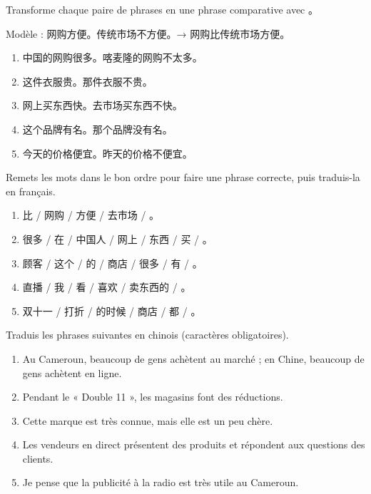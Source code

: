 \documentclass[11pt]{article}
\newcommand{\zh}[1]{\ifmmode\text{#1}\else{#1}\fi}
\begin{document}
\begin{exercice}
Transforme chaque paire de phrases en une phrase comparative avec \zh{比}。

Modèle : 网购方便。传统市场不方便。→ 网购比传统市场方便。

\begin{enumerate}
\item 中国的网购很多。喀麦隆的网购不太多。
\item 这件衣服贵。那件衣服不贵。
\item 网上买东西快。去市场买东西不快。
\item 这个品牌有名。那个品牌没有名。
\item 今天的价格便宜。昨天的价格不便宜。
\end{enumerate}
\end{exercice}

\begin{exercice}
Remets les mots dans le bon ordre pour faire une phrase correcte, puis traduis-la en français.

\begin{enumerate}
\item 比 / 网购 / 方便 / 去市场 / 。
\item 很多 / 在 / 中国人 / 网上 / 东西 / 买 / 。
\item 顾客 / 这个 / 的 / 商店 / 很多 / 有 / 。
\item 直播 / 我 / 看 / 喜欢 / 卖东西的 / 。
\item 双十一 / 打折 / 的时候 / 商店 / 都 / 。
\end{enumerate}
\end{exercice}

\begin{exercice}
Traduis les phrases suivantes en chinois (caractères obligatoires).

\begin{enumerate}
\item Au Cameroun, beaucoup de gens achètent au marché ; en Chine, beaucoup de gens achètent en ligne.
\item Pendant le « Double 11 », les magasins font des réductions.
\item Cette marque est très connue, mais elle est un peu chère.
\item Les vendeurs en direct présentent des produits et répondent aux questions des clients.
\item Je pense que la publicité à la radio est très utile au Cameroun.
\end{enumerate}
\end{exercice}
\end{document}
